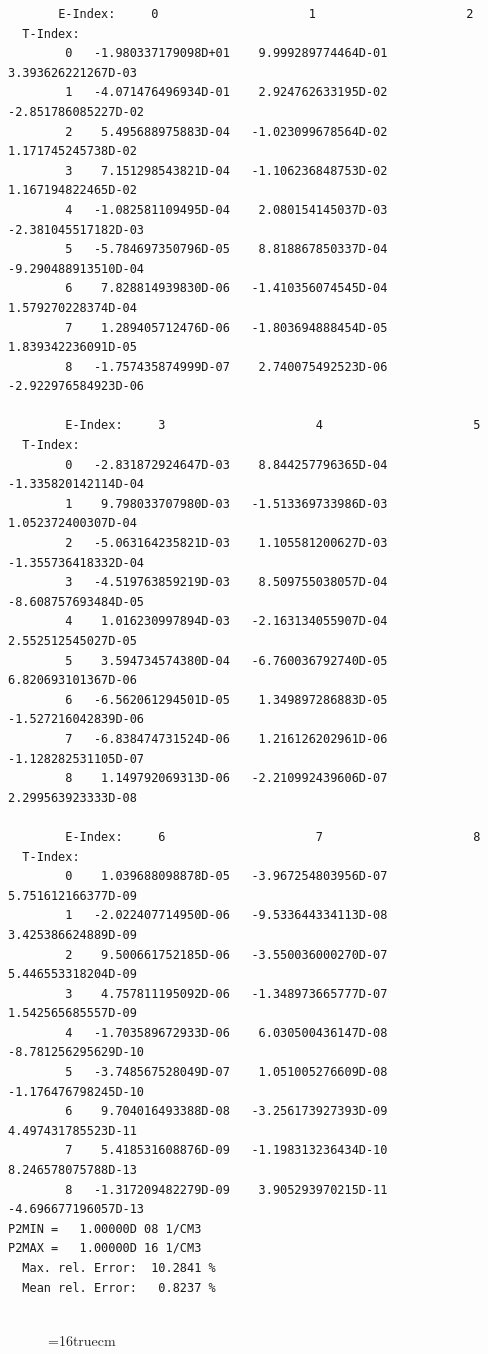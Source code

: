 \documentclass[12pt,dvipdfmx]{article}
\begin{document}
\begin{small}\begin{verbatim}
       E-Index:     0                     1                     2
  T-Index:
        0   -1.980337179098D+01    9.999289774464D-01    3.393626221267D-03
        1   -4.071476496934D-01    2.924762633195D-02   -2.851786085227D-02
        2    5.495688975883D-04   -1.023099678564D-02    1.171745245738D-02
        3    7.151298543821D-04   -1.106236848753D-02    1.167194822465D-02
        4   -1.082581109495D-04    2.080154145037D-03   -2.381045517182D-03
        5   -5.784697350796D-05    8.818867850337D-04   -9.290488913510D-04
        6    7.828814939830D-06   -1.410356074545D-04    1.579270228374D-04
        7    1.289405712476D-06   -1.803694888454D-05    1.839342236091D-05
        8   -1.757435874999D-07    2.740075492523D-06   -2.922976584923D-06

        E-Index:     3                     4                     5
  T-Index:
        0   -2.831872924647D-03    8.844257796365D-04   -1.335820142114D-04
        1    9.798033707980D-03   -1.513369733986D-03    1.052372400307D-04
        2   -5.063164235821D-03    1.105581200627D-03   -1.355736418332D-04
        3   -4.519763859219D-03    8.509755038057D-04   -8.608757693484D-05
        4    1.016230997894D-03   -2.163134055907D-04    2.552512545027D-05
        5    3.594734574380D-04   -6.760036792740D-05    6.820693101367D-06
        6   -6.562061294501D-05    1.349897286883D-05   -1.527216042839D-06
        7   -6.838474731524D-06    1.216126202961D-06   -1.128282531105D-07
        8    1.149792069313D-06   -2.210992439606D-07    2.299563923333D-08

        E-Index:     6                     7                     8
  T-Index:
        0    1.039688098878D-05   -3.967254803956D-07    5.751612166377D-09
        1   -2.022407714950D-06   -9.533644334113D-08    3.425386624889D-09
        2    9.500661752185D-06   -3.550036000270D-07    5.446553318204D-09
        3    4.757811195092D-06   -1.348973665777D-07    1.542565685557D-09
        4   -1.703589672933D-06    6.030500436147D-08   -8.781256295629D-10
        5   -3.748567528049D-07    1.051005276609D-08   -1.176476798245D-10
        6    9.704016493388D-08   -3.256173927393D-09    4.497431785523D-11
        7    5.418531608876D-09   -1.198313236434D-10    8.246578075788D-13
        8   -1.317209482279D-09    3.905293970215D-11   -4.696677196057D-13
P2MIN =   1.00000D 08 1/CM3
P2MAX =   1.00000D 16 1/CM3
  Max. rel. Error:  10.2841 %
  Mean rel. Error:   0.8237 %


\end{verbatim}\end{small}
\begin{figure} \label{2.2.15b}
\epsfxsize=16truecm
\end{figure}
\newpage
\end{document}
